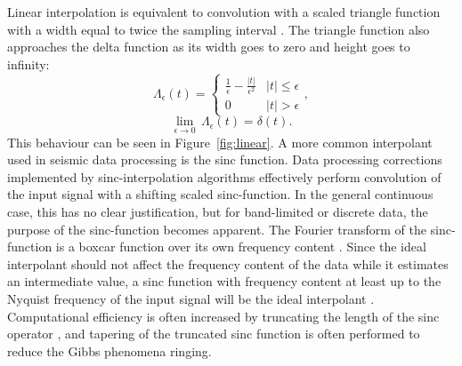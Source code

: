 Linear interpolation is equivalent to convolution with a scaled triangle function with a width equal to twice the sampling interval \cite{harlan82}.
The triangle function also approaches the delta function as its width goes to zero and height goes to infinity:
\begin{equation}
	\label{eq:triangle}
	\Lambda_{\epsilon} \left( t \right) = \left\{
	\begin{array}{cc}
	 \frac{1}{\epsilon} - \frac{|t|}{\epsilon^2} & |t| \leq \epsilon \\
	 0 & |t| > \epsilon 
	\end{array}
	\right.,
\end{equation} 
\begin{equation}
	\label{eq:delta_triangle}
	\lim_{\epsilon \to 0} \, \Lambda_{\epsilon} \left( t \right) = \delta \left( t \right).
\end{equation} 
This behaviour can be seen in Figure~\ref{fig:linear}.  
A more common interpolant used in seismic data processing is the sinc function.
Data processing corrections implemented by sinc-interpolation algorithms effectively perform convolution of the input signal with a shifting scaled sinc-function.
In the general continuous case, this has no clear justification, but for band-limited or discrete data, the purpose of the sinc-function becomes apparent.
The Fourier transform of the sinc-function is a boxcar function over its own frequency content \cite{harlan82}.
Since the ideal interpolant should not affect the frequency content of the data while it estimates an intermediate value, a sinc function with frequency content at least up to the Nyquist frequency of the input signal will be the ideal interpolant \cite{harlan82}.
Computational efficiency is often increased by truncating the length of the sinc operator \cite{harlan82}, and tapering of the truncated sinc function is often performed \cite{rosenbaum_boudreaux81} to reduce the Gibbs phenomena ringing.     

